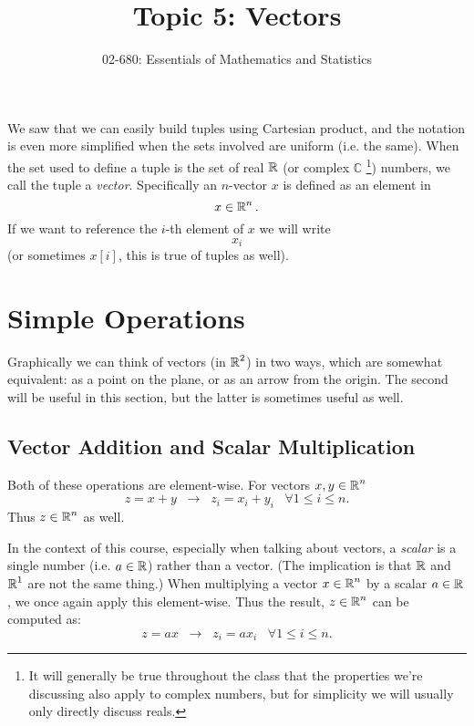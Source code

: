 


\title{Topic 5: Vectors}
\author{02-680: Essentials of Mathematics and Statistics}


\maketitle

We saw that we can easily build tuples using Cartesian product, and the notation is even more simplified when the sets involved are uniform (i.e. the same). 
When the set used to define a tuple is the set of real $\operatorname{\mathbb{R}}$ (or complex $\mathbb{C}$%
\footnote{It will generally be true throughout the class that the properties we're discussing also apply to complex numbers, but for simplicity we will usually only directly discuss reals.})
numbers, we call the tuple a \emph{vector}.
Specifically an $n$-vector $x$ is defined as an element in \[x\in \operatorname{\mathbb{R}}^n.\] 
If we want to reference the $i$-th element of $x$ we will write \[x_i\] (or sometimes $x[i]$, this is true of tuples as well).

\section{Simple Operations}
Graphically we can think of vectors (in $\operatorname{\mathbb{R}}^2$) in two ways, which are somewhat equivalent: 
as a point on the plane, or as an arrow from the origin.
The second will be useful in this section, but the latter is sometimes useful as well. 


\subsection{Vector Addition and Scalar Multiplication}
Both of these operations are element-wise. 
For vectors $x,y \in \operatorname{\mathbb{R}}^n$
\[
z = x+y \;\;\rightarrow \;\; z_i = x_i + y_i \;\;\; \forall 1 \le i \le n.
\]
Thus $z \in \operatorname{\mathbb{R}}^n$ as well. 

In the context of this course, especially when talking about vectors, a \emph{scalar} is a single number (i.e. $a \in \operatorname{\mathbb{R}}$) rather than a vector. 
(The implication is that $\operatorname{\mathbb{R}}$ and $\operatorname{\mathbb{R}}^1$ are not the same thing.)
When multiplying a vector $x\in \operatorname{\mathbb{R}}^n$ by a scalar $a\in\operatorname{\mathbb{R}}$, we once again apply this element-wise. 
Thus the result, $z\in\operatorname{\mathbb{R}}^n$ can be computed as:
\[
z = ax \;\; \rightarrow \;\; z_i = a x_i \;\;\; \forall 1 \le i \le n.
\]

